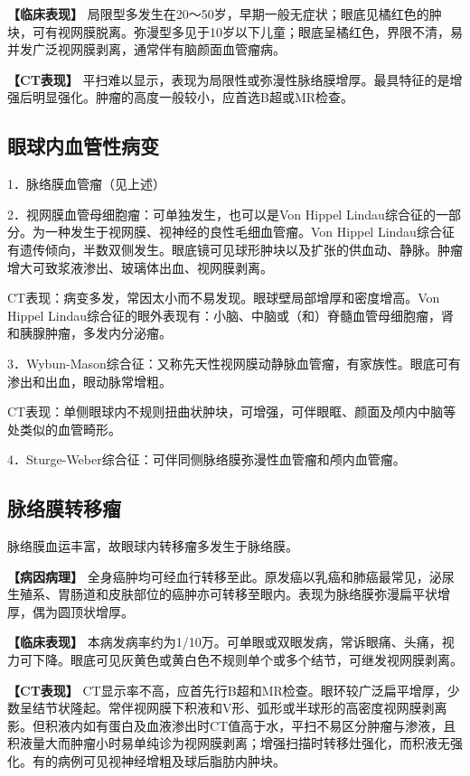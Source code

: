 \textbf{【临床表现】}
局限型多发生在20～50岁，早期一般无症状；眼底见橘红色的肿块，可有视网膜脱离。弥漫型多见于10岁以下儿童；眼底呈橘红色，界限不清，易并发广泛视网膜剥离，通常伴有脑颜面血管瘤病。

\textbf{【CT表现】}
平扫难以显示，表现为局限性或弥漫性脉络膜增厚。最具特征的是增强后明显强化。肿瘤的高度一般较小，应首选B超或MR检查。

\subsection{眼球内血管性病变}

1．脉络膜血管瘤（见上述）

2．视网膜血管母细胞瘤：可单独发生，也可以是Von Hippel
Lindau综合征的一部分。为一种发生于视网膜、视神经的良性毛细血管瘤。Von
Hippel
Lindau综合征有遗传倾向，半数双侧发生。眼底镜可见球形肿块以及扩张的供血动、静脉。肿瘤增大可致浆液渗出、玻璃体出血、视网膜剥离。

CT表现：病变多发，常因太小而不易发现。眼球壁局部增厚和密度增高。Von
Hippel
Lindau综合征的眼外表现有：小脑、中脑或（和）脊髓血管母细胞瘤，肾和胰腺肿瘤，多发内分泌瘤。

3．Wybun-Mason综合征：又称先天性视网膜动静脉血管瘤，有家族性。眼底可有渗出和出血，眼动脉常增粗。

CT表现：单侧眼球内不规则扭曲状肿块，可增强，可伴眼眶、颜面及颅内中脑等处类似的血管畸形。

4．Sturge-Weber综合征：可伴同侧脉络膜弥漫性血管瘤和颅内血管瘤。

\subsection{脉络膜转移瘤}

脉络膜血运丰富，故眼球内转移瘤多发生于脉络膜。

\textbf{【病因病理】}
全身癌肿均可经血行转移至此。原发癌以乳癌和肺癌最常见，泌尿生殖系、胃肠道和皮肤部位的癌肿亦可转移至眼内。表现为脉络膜弥漫扁平状增厚，偶为圆顶状增厚。

\textbf{【临床表现】}
本病发病率约为1/10万。可单眼或双眼发病，常诉眼痛、头痛，视力可下降。眼底可见灰黄色或黄白色不规则单个或多个结节，可继发视网膜剥离。

\textbf{【CT表现】}
CT显示率不高，应首先行B超和MR检查。眼环较广泛扁平增厚，少数呈结节状隆起。常伴视网膜下积液和V形、弧形或半球形的高密度视网膜剥离影。但积液内如有蛋白及血液渗出时CT值高于水，平扫不易区分肿瘤与渗液，且积液量大而肿瘤小时易单纯诊为视网膜剥离；增强扫描时转移灶强化，而积液无强化。有的病例可见视神经增粗及球后脂肪内肿块。

